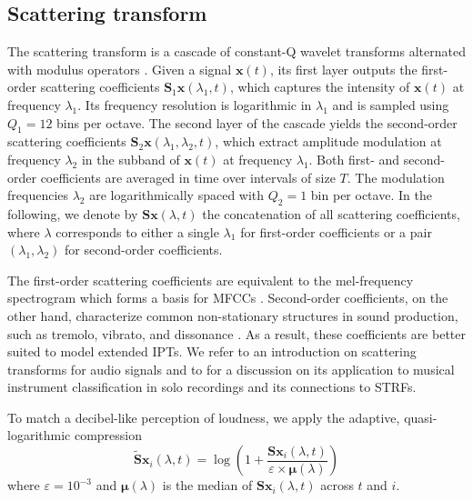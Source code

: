 \subsection{Scattering transform} %
The scattering transform is a cascade of constant-Q wavelet transforms alternated with modulus operators \cite{mallat2012cpam,anden2014taslp}.
Given a signal $\boldsymbol{x} (t)$, its first layer outputs the first-order scattering coefficients $\mathbf{S}_1 \boldsymbol{x} (\lambda_1, t)$, which captures the intensity of $\boldsymbol{x} (t)$ at frequency $\lambda_1$.
Its frequency resolution is logarithmic in $\lambda_1$ and is sampled using $Q_1 = 12$ bins per octave.
The second layer of the cascade yields the second-order scattering coefficients $\mathbf{S}_2 \boldsymbol{x} (\lambda_1, \lambda_2, t)$, which extract amplitude modulation at frequency $\lambda_2$ in the subband of $\boldsymbol{x} (t)$ at frequency $\lambda_1$.
Both first- and second-order coefficients are averaged in time over intervals of size $T$.
The modulation frequencies $\lambda_2$ are logarithmically spaced with $Q_2 = 1$ bin per octave.
In the following, we denote by $\mathbf{S}\boldsymbol{x}(\lambda, t)$ the concatenation of all scattering coefficients, where $\lambda$ corresponds to either a single $\lambda_1$ for first-order coefficients or a pair $(\lambda_1,\lambda_2)$ for second-order coefficients.

The first-order scattering coefficients are equivalent to the mel-frequency spectrogram which forms a basis for MFCCs \cite{anden2014taslp}.
Second-order coefficients, on the other hand, characterize common non-stationary structures in sound production, such as tremolo, vibrato, and dissonance \cite[section 4]{anden2012dafx}.
As a result, these coefficients are better suited to model extended IPTs.
We refer to \cite{anden2014taslp} an introduction on scattering transforms for audio signals and to \cite[sections 3.2 and 4.5]{lostanlen2017phd} for a discussion on its application to musical instrument classification in solo recordings and its connections to STRFs.

To match a decibel-like perception of loudness, we apply the adaptive, quasi-logarithmic compression
\begin{equation}
\widetilde{\mathbf{S}} \boldsymbol{x}_i(\lambda, t) =
\log \left(
1 + \dfrac{\mathbf{S}\boldsymbol{x}_i(\lambda, t)}{\varepsilon \times \boldsymbol{\mu}(\lambda)}
\right)
\label{eq:log-scattering}
\end{equation}
where $\varepsilon = 10^{-3}$ and $\boldsymbol{\mu}(\lambda)$ is the median of $\mathbf{S}\boldsymbol{x}_i (\lambda, t)$ across $t$ and $i$.

